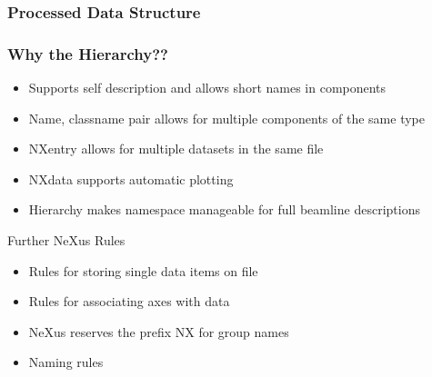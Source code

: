 \documentclass{beamer}
\begin{document}
\begin{frame} \frametitle{Processed Data Structure}
\begin{figure}[!ht]
\end{figure}
\end{frame}


\begin{frame} \frametitle{Why the Hierarchy??}
\begin{itemize}
\item<1->Supports self description and allows short names in components
\item<2->Name, classname pair allows for multiple components of the same type
\item<3->NXentry allows for multiple datasets in the same file
\item<4->NXdata supports automatic plotting
\item<5->Hierarchy makes namespace manageable for full beamline descriptions
\end{itemize}
\end{frame}

\begin{frame}{Further NeXus Rules}
\begin{itemize}
\item Rules for storing single data items on file
\item Rules for associating axes with data
\item NeXus reserves the prefix NX for group names
\item Naming rules
\end{itemize}
\end{frame}
\end{document}
